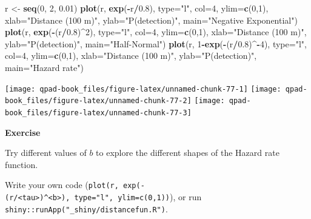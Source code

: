 \documentclass[12pt,]{book}
\newenvironment{Shaded}{\begin{snugshade}}{\end{snugshade}}
\newcommand{\DataTypeTok}[1]{\textcolor[rgb]{0.13,0.29,0.53}{#1}}
\newcommand{\DecValTok}[1]{\textcolor[rgb]{0.00,0.00,0.81}{#1}}
\newcommand{\FloatTok}[1]{\textcolor[rgb]{0.00,0.00,0.81}{#1}}
\newcommand{\KeywordTok}[1]{\textcolor[rgb]{0.13,0.29,0.53}{\textbf{#1}}}
\newcommand{\NormalTok}[1]{#1}
\newcommand{\OperatorTok}[1]{\textcolor[rgb]{0.81,0.36,0.00}{\textbf{#1}}}
\newcommand{\StringTok}[1]{\textcolor[rgb]{0.31,0.60,0.02}{#1}}
\let\BeginKnitrBlock\begin \let\EndKnitrBlock\end
\begin{document}
\begin{Shaded}
\begin{Highlighting}[]
\NormalTok{r <-}\StringTok{ }\KeywordTok{seq}\NormalTok{(}\DecValTok{0}\NormalTok{, }\DecValTok{2}\NormalTok{, }\FloatTok{0.01}\NormalTok{)}
\KeywordTok{plot}\NormalTok{(r, }\KeywordTok{exp}\NormalTok{(}\OperatorTok{-}\NormalTok{r}\OperatorTok{/}\FloatTok{0.8}\NormalTok{), }\DataTypeTok{type=}\StringTok{"l"}\NormalTok{, }\DataTypeTok{col=}\DecValTok{4}\NormalTok{, }\DataTypeTok{ylim=}\KeywordTok{c}\NormalTok{(}\DecValTok{0}\NormalTok{,}\DecValTok{1}\NormalTok{),}
  \DataTypeTok{xlab=}\StringTok{"Distance (100 m)"}\NormalTok{, }\DataTypeTok{ylab=}\StringTok{"P(detection)"}\NormalTok{, }\DataTypeTok{main=}\StringTok{"Negative Exponential"}\NormalTok{)}
\KeywordTok{plot}\NormalTok{(r, }\KeywordTok{exp}\NormalTok{(}\OperatorTok{-}\NormalTok{(r}\OperatorTok{/}\FloatTok{0.8}\NormalTok{)}\OperatorTok{^}\DecValTok{2}\NormalTok{), }\DataTypeTok{type=}\StringTok{"l"}\NormalTok{, }\DataTypeTok{col=}\DecValTok{4}\NormalTok{, }\DataTypeTok{ylim=}\KeywordTok{c}\NormalTok{(}\DecValTok{0}\NormalTok{,}\DecValTok{1}\NormalTok{),}
  \DataTypeTok{xlab=}\StringTok{"Distance (100 m)"}\NormalTok{, }\DataTypeTok{ylab=}\StringTok{"P(detection)"}\NormalTok{, }\DataTypeTok{main=}\StringTok{"Half-Normal"}\NormalTok{)}
\KeywordTok{plot}\NormalTok{(r, }\DecValTok{1}\OperatorTok{-}\KeywordTok{exp}\NormalTok{(}\OperatorTok{-}\NormalTok{(r}\OperatorTok{/}\FloatTok{0.8}\NormalTok{)}\OperatorTok{^-}\DecValTok{4}\NormalTok{), }\DataTypeTok{type=}\StringTok{"l"}\NormalTok{, }\DataTypeTok{col=}\DecValTok{4}\NormalTok{, }\DataTypeTok{ylim=}\KeywordTok{c}\NormalTok{(}\DecValTok{0}\NormalTok{,}\DecValTok{1}\NormalTok{),}
  \DataTypeTok{xlab=}\StringTok{"Distance (100 m)"}\NormalTok{, }\DataTypeTok{ylab=}\StringTok{"P(detection)"}\NormalTok{, }\DataTypeTok{main=}\StringTok{"Hazard rate"}\NormalTok{)}
\end{Highlighting}
\end{Shaded}

\texttt{[image: qpad-book\_files/figure-latex/unnamed-chunk-77-1]} \texttt{[image: qpad-book\_files/figure-latex/unnamed-chunk-77-2]} \texttt{[image: qpad-book\_files/figure-latex/unnamed-chunk-77-3]}

\BeginKnitrBlock{rmdexercise}
\textbf{Exercise}

Try different values of \(b\) to explore the different shapes of the Hazard rate function.

Write your own code (\texttt{plot(r,\ exp(-(r/\textless{}tau\textgreater{})\^{}\textless{}b\textgreater{}),\ type="l",\ ylim=c(0,1))}), or run \texttt{shiny::runApp("\_shiny/distancefun.R")}.
\EndKnitrBlock{rmdexercise}
\end{document}
